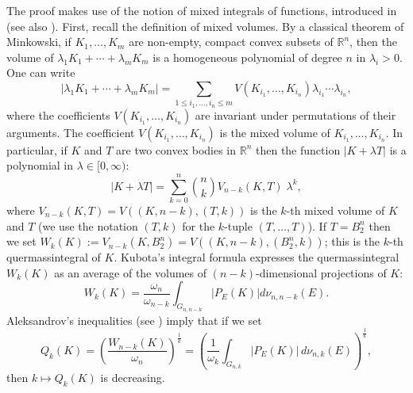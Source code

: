 \documentclass[11pt,leqno]{article}
\theoremstyle{definition}
\theoremstyle{remark}
\numberwithin{equation}{section}
\newcommand{\ls}{\leqslant}
\newcommand{\1}{\textbf{1}}
\begin{document}
The proof makes use of the notion of mixed integrals of functions, introduced in \cite{VMilman-Rotem-2013}
(see also \cite{Bobkov-Colesanti-Fragala-2014}). First, recall the definition of mixed volumes.
By a classical theorem of Minkowski, if $K_1,\ldots ,K_m$ are non-empty, compact convex
subsets of ${\mathbb R}^n$, then the volume of $\lambda_1K_1+\cdots +\lambda_mK_m$ is a homogeneous polynomial of degree $n$ in
$\lambda_i>0$. One can write
\begin{equation*}|\lambda_1K_1+\cdots +\lambda_mK_m|=\sum_{1\ls i_1,\ldots ,i_n\ls m}
V(K_{i_1},\ldots ,K_{i_n})\lambda_{i_1}\cdots \lambda_{i_n},\end{equation*}
where the coefficients $V(K_{i_1},\ldots ,K_{i_n})$ are invariant under permutations of their arguments. The coefficient $V(K_{i_1},\ldots ,K_{i_n})$ is the mixed volume of $K_{i_1},\ldots ,K_{i_n}$. In particular, if $K$ and $T$ are two convex bodies in ${\mathbb R}^n$
then the function $|K+\lambda T|$ is a polynomial in $\lambda\in [0,\infty )$:
\begin{equation*}|K+\lambda T|=\sum_{k=0}^n \binom{n}{k} V_{n-k}(K,T)\;\lambda^k,\end{equation*}
where $V_{n-k}(K,T)= V((K,n-k),(T,k))$ is the $k$-th mixed volume of $K$ and $T$ (we use  the notation $(T,k)$ for the
$k$-tuple $(T,\ldots ,T)$). If $T=B_2^n$ then we set $W_k(K):=V_{n-k}(K,B_2^n)=V((K, n-k), (B_2^n, k))$; this is the
$k$-th quermassintegral of $K$. Kubota's integral formula expresses the quermassintegral $W_k(K)$ as an average of the volumes of
$(n-k)$-dimensional projections of $K$:
\begin{equation}\label{eq:kubota}W_k(K)=\frac{\omega_n}{\omega_{n-k}}\int_{G_{n,n-k}}
|P_E(K)|d\nu_{n,n-k}(E).\end{equation}
Aleksandrov's inequalities (see \cite{Schneider-book}) imply that if we set
\begin{equation}\label{eq:aleksandrov-1}Q_k(K)=\left
(\frac{W_{n-k}(K)}{\omega_n}\right )^{\frac{1}{k}}=\left
(\frac{1}{\omega_k}\int_{G_{n,k}}|P_E(K)|\,d\nu_{n,k}(E)\right )^{\frac{1}{k}},\end{equation}
then $k\mapsto Q_k(K)$ is decreasing.
\end{document}
